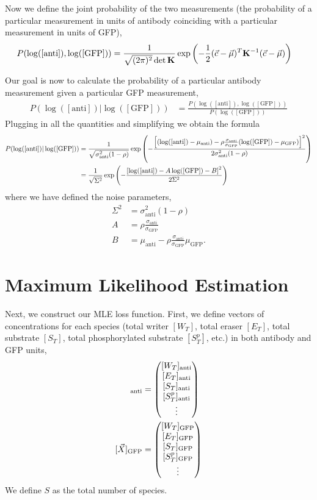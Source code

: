 \documentclass[aps,onecolumn,superscriptaddress,notitlepage]{revtex4-1}
\newcommand{\sigmaGFP}{\sigma_{\mathrm{GFP}}}
\newcommand{\sigmaanti}{\sigma_{\mathrm{anti}}}
\newcommand{\muGFP}{\mu_{\mathrm{GFP}}}
\newcommand{\muanti}{\mu_{\mathrm{anti}}}
\newcommand{\lGFP}{\log([\mathrm{GFP}])}
\newcommand{\lanti}{\log([\mathrm{anti}])}
\begin{document}
Now we define the joint probability of the two measurements (the probability of a particular measurement in units of antibody coinciding with a particular measurement in units of GFP),
\begin{align}
P(\lanti, \lGFP) &= \frac{1}{\sqrt{(2\pi)^2}\det \mathbf{K}}\exp\qty(-\frac{1}{2}(\vec{c}-\vec{\mu})^T \mathbf{K}^{-1}(\vec{c}-\vec{\mu}))
\end{align}

Our goal is now to calculate the probability of a particular antibody measurement given a particular GFP measurement,
\begin{align}
P(\lanti | \lGFP) &= \frac{P(\lanti, \lGFP)}{P(\lGFP)}
\end{align}
Plugging in all the quantities and simplifying we obtain the formula
\begin{align}
P(\lanti | \lGFP) &= \frac{1}{\sqrt{\sigmaanti^2(1-\rho)}}\exp\qty(-\frac{\qty[(\lanti-\muanti) - \rho \frac{\sigmaanti}{\sigmaGFP}(\lGFP-\muGFP)]^2}{2 \sigmaanti^2(1-\rho)})\\
&= \frac{1}{\sqrt{\Sigma^2}}\exp\qty(-\frac{\qty[\lanti -A\lGFP - B]^2}{2 \Sigma^2})
\end{align}
where we have defined the noise parameters,
\begin{align}
\Sigma^2 &= \sigmaanti^2(1-\rho)\\
A &=  \rho \frac{\sigmaanti}{\sigmaGFP}\\
B &= \muanti - \rho \frac{\sigmaanti}{\sigmaGFP}\muGFP.
\end{align}


\section{Maximum Likelihood Estimation}
Next, we construct our MLE loss function.
First, we define vectors of concentrations for each species (total writer $[W_T]$, total eraser $[E_T]$, total substrate $[S_T]$, total phosphorylated substrate $[S_T^p]$, etc.) in both antibody and GFP units,
\begin{align}
[\vec{X}]_{\mathrm{anti}} &= \mqty([W_T]_{\mathrm{anti}}\\
[E_T]_{\mathrm{anti}}\\
[S_T]_{\mathrm{anti}}\\
[S^p_T]_{\mathrm{anti}}\\
\vdots)\\
[\vec{X}]_{\mathrm{GFP}} &= \mqty([W_T]_{\mathrm{GFP}}\\
[E_T]_{\mathrm{GFP}}\\
[S_T]_{\mathrm{GFP}}\\
[S^p_T]_{\mathrm{GFP}}\\
\vdots)
\end{align}
We define $S$ as the total number of species.
\end{document}
